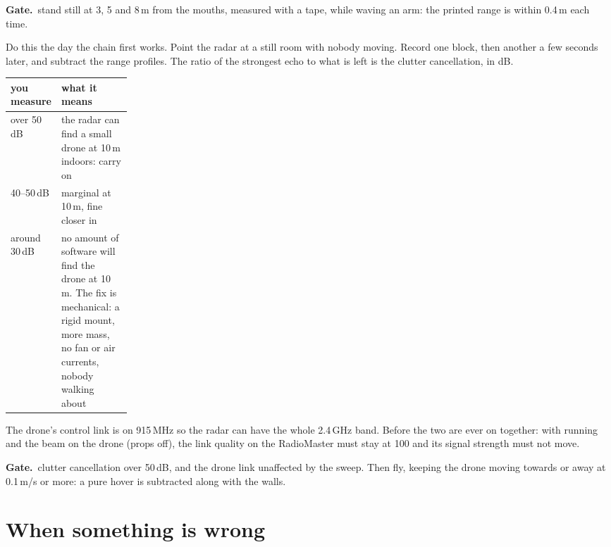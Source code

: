 \documentclass[10pt]{article}
\newcommand{\gate}[1]{\begin{okbox}\textbf{\color{okgreen!70!black}Gate.}\ #1\end{okbox}}
\begin{document}
\gate{stand still at 3, 5 and 8\,m from the mouths, measured with a tape, while waving an arm: the printed range is within 0.4\,m each time.}

Do this the day the chain first works. Point the radar at a still room with nobody moving. Record one block, then another a few seconds later, and subtract the range profiles. The ratio of the strongest echo to what is left is the clutter cancellation, in dB.

{\small
\begin{tabularx}{\linewidth}{@{}P{0.2\linewidth}L@{}}
\toprule
\textbf{you measure} & \textbf{what it means} \\ \midrule
over 50\,dB & the radar can find a small drone at 10\,m indoors: carry on \\
40–50\,dB & marginal at 10\,m, fine closer in \\
around 30\,dB & no amount of software will find the drone at 10\,m. The fix is mechanical: a rigid mount, more mass, no fan or air currents, nobody walking about \\
\bottomrule
\end{tabularx}}

The drone's control link is on 915\,MHz so the radar can have the whole 2.4\,GHz band. Before the two are ever on together: with  running and the beam on the drone (props off), the link quality on the RadioMaster must stay at 100 and its signal strength must not move.

\gate{clutter cancellation over 50\,dB, and the drone link unaffected by the sweep. Then fly, keeping the drone moving towards or away at 0.1\,m/s or more: a pure hover is subtracted along with the walls.}

\newpage
\section{When something is wrong}\label{sec:trouble}
\end{document}
